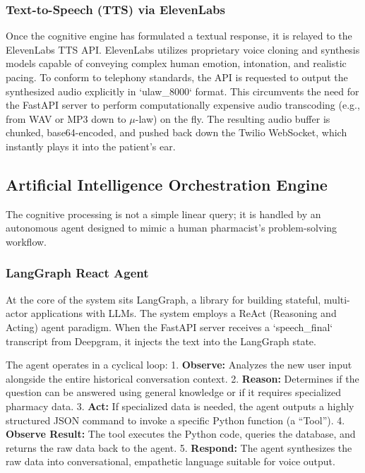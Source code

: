 \documentclass[conference,a4paper]{IEEEtran}
\begin{document}
\subsubsection{Text-to-Speech (TTS) via ElevenLabs}
Once the cognitive engine has formulated a textual response, it is relayed to the ElevenLabs TTS API. ElevenLabs utilizes proprietary voice cloning and synthesis models capable of conveying complex human emotion, intonation, and realistic pacing. To conform to telephony standards, the API is requested to output the synthesized audio explicitly in `ulaw_8000` format. This circumvents the need for the FastAPI server to perform computationally expensive audio transcoding (e.g., from WAV or MP3 down to $\mu$-law) on the fly. The resulting audio buffer is chunked, base64-encoded, and pushed back down the Twilio WebSocket, which instantly plays it into the patient's ear.

\subsection{Artificial Intelligence Orchestration Engine}
The cognitive processing is not a simple linear query; it is handled by an autonomous agent designed to mimic a human pharmacist's problem-solving workflow.

\subsubsection{LangGraph React Agent}
At the core of the system sits LangGraph, a library for building stateful, multi-actor applications with LLMs. The system employs a ReAct (Reasoning and Acting) agent paradigm. When the FastAPI server receives a `speech_final` transcript from Deepgram, it injects the text into the LangGraph state. 

The agent operates in a cyclical loop:
1. \textbf{Observe:} Analyzes the new user input alongside the entire historical conversation context.
2. \textbf{Reason:} Determines if the question can be answered using general knowledge or if it requires specialized pharmacy data.
3. \textbf{Act:} If specialized data is needed, the agent outputs a highly structured JSON command to invoke a specific Python function (a ``Tool''). 
4. \textbf{Observe Result:} The tool executes the Python code, queries the database, and returns the raw data back to the agent.
5. \textbf{Respond:} The agent synthesizes the raw data into conversational, empathetic language suitable for voice output.
\end{document}

